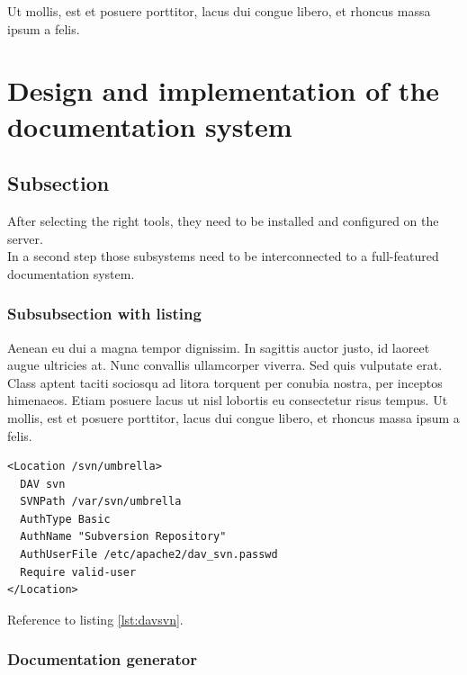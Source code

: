 Ut mollis, est et posuere porttitor, lacus dui congue libero, et
rhoncus massa ipsum a felis. 


\newpage
\section{Design and implementation of the documentation system}


\subsection{Subsection}
After selecting the right tools, they need to be installed and configured on the
server.\\ In a second step those subsystems need to be interconnected to a
full-featured documentation system.

\subsubsection{Subsubsection with listing}

Aenean eu dui a magna tempor dignissim. In sagittis auctor justo, id laoreet
augue ultricies at. Nunc convallis ullamcorper viverra. Sed quis vulputate
erat. Class aptent taciti sociosqu ad litora torquent per conubia nostra, per
inceptos himenaeos. Etiam posuere lacus ut nisl lobortis eu consectetur risus
tempus. Ut mollis, est et posuere porttitor, lacus dui congue libero, et
rhoncus massa ipsum a felis. 

\begin{lstlisting}[breaklines=true,frame=single,caption={WebDAV configuration in /etc/apache2/mods-available/dav\_svn.conf},label=lst:davsvn]
<Location /svn/umbrella>
  DAV svn
  SVNPath /var/svn/umbrella
  AuthType Basic
  AuthName "Subversion Repository"
  AuthUserFile /etc/apache2/dav_svn.passwd
  Require valid-user
</Location>
\end{lstlisting}

Reference to listing \ref{lst:davsvn}.



\subsubsection{Documentation generator}
\label{sec:documentation_generator}

